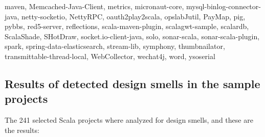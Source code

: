\documentclass[onecolumn]{article}
\begin{document}
maven, Memcached-Java-Client, metrics, micronaut-core, mysql-binlog-connector-java, netty-socketio, NettyRPC, oauth2play2scala, opslabJutil, PayMap, pig, pybbs, red5-server, reflections, scala-maven-plugin, scalagwt-sample, scalardb, ScalaShade, SHotDraw, socket.io-client-java, solo, sonar-scala, sonar-scala-plugin, spark, spring-data-elasticsearch, stream-lib, symphony, thumbnailator, transmittable-thread-local, WebCollector, wechat4j, word, ysoserial


\subsection{Results of detected design smells in the sample projects} \label{appendix_design_smells_in_sample_projects}
The 241 selected Scala projects where analyzed for design smells, and these are the results:
\end{document}
